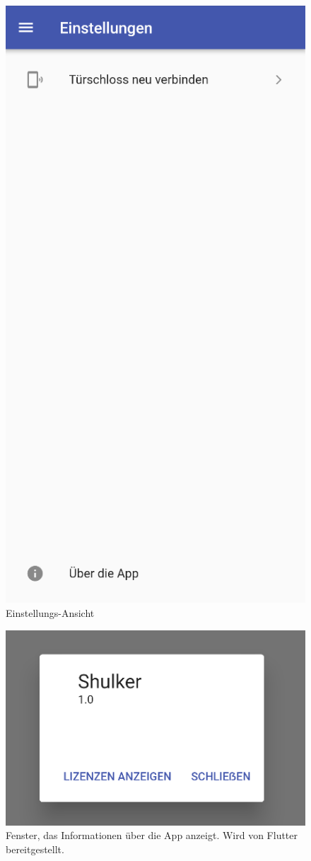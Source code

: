 \begin{figure}[H]
    \begin{center}
        \includegraphics[width=.6\textwidth]{images/mobile/Settings.png}
        \caption{Einstellungs-Ansicht}
    \end{center}
\end{figure}

\begin{figure}[H]
    \begin{center}
        \includegraphics[width=.6\textwidth]{images/mobile/AboutTheApp.png}
        \caption{Fenster, das Informationen über die App anzeigt. Wird von Flutter bereitgestellt. }
    \end{center}
\end{figure}

